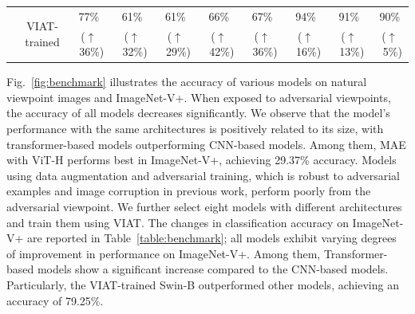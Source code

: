 \documentclass[10pt,journal,compsoc]{IEEEtran}
\begin{document}
\begin{table}[t]
\begin{tabular}{c|c|ccccc|ccc}
                        & \multirow{2}{*}{VIAT-trained} & \multicolumn{1}{c|}{77\%}          & \multicolumn{1}{c|}{61\%}             & \multicolumn{1}{c|}{61\%}                    & \multicolumn{1}{c|}{66\%}               &  67\%            & \multicolumn{1}{c|}{94\%}         & \multicolumn{1}{c|}{91\%}       &  90\%      \\
                        &                               & \multicolumn{1}{c|}{($\uparrow$~36\%)  }          & \multicolumn{1}{c|}{($\uparrow$~32\%) }             & \multicolumn{1}{c|}{($\uparrow$~29\%) }                    & \multicolumn{1}{c|}{($\uparrow$~42\%) }               & ($\uparrow$~36\%)               & \multicolumn{1}{c|}{($\uparrow$~16\%) }         & \multicolumn{1}{c|}{($\uparrow$~13\%) }       & ($\uparrow$~5\%)        \\ \hline
\end{tabular}
\label{table:certify}
\end{table}

Fig.~\ref{fig:benchmark} illustrates the accuracy of various models on natural viewpoint images and ImageNet-V+. When exposed to adversarial viewpoints, the accuracy of all models decreases significantly. We observe that the model's performance with the same architectures is positively related to its size, with transformer-based models outperforming CNN-based models. Among them, MAE with ViT-H performs best in ImageNet-V+, achieving 29.37\% accuracy. Models using data augmentation and adversarial training, which is robust to adversarial examples and image corruption in previous work, perform poorly from the adversarial viewpoint. We further select eight models with different architectures and train them using VIAT. The changes in classification accuracy on ImageNet-V+ are reported in Table~\ref{table:benchmark}; all models exhibit varying degrees of improvement in performance on ImageNet-V+. Among them, Transformer-based models show a significant increase compared to the CNN-based models. Particularly, the VIAT-trained Swin-B outperformed other models, achieving an accuracy of 79.25\%.
\end{document}

